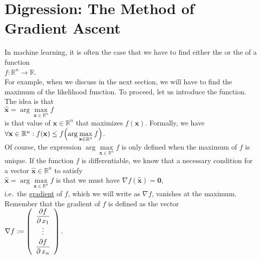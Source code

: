 \section{Digression: The Method of Gradient Ascent \label{section:gradient-ascent}}
In machine learning, it is often the case that we have to find either the  or the 
of a function 
\\[0.2cm]
\hspace*{1.3cm}
$f: \mathbb{R}^n \rightarrow \mathbb{R}$.
\\[0.2cm]
For example, when we discuss  in the next section, we will have to find the maximum
of the likelihood function.  To proceed, let us introduce the \blue{$\arg\max$} function.  The idea is that
\\[0.2cm]
\hspace*{1.3cm}
$\mathbf{\widehat{x}} = \arg\max\limits_{\mathbf{x}\in \mathbb{R}^n} f$
\\[0.2cm]
is that value of $\mathbf{x} \in \mathbb{R}^n$ that maximizes $ f(\mathbf{x})$.  Formally, we have
\\[0.2cm]
\hspace*{1.3cm}
$\forall \mathbf{x} \in \mathbb{R}^n : f(\mathbf{x}) \leq f\Bigl(\arg\max\limits_{\mathbf{x}\in \mathbb{R}^n} f\Bigr)$.
\\[0.2cm]
Of course, the expression $\arg\max\limits_{\mathbf{x}\in \mathbb{R}^n} f$ is only defined when the maximum of
$f$ is unique.  If the function $f$ is differentiable, we know that a necessary condition for a vector
$\mathbf{\widehat{x}} \in \mathbb{R}^n$ to satisfy
\\[0.2cm]
\hspace*{1.3cm}
$\mathbf{\widehat{x}} = \arg\max\limits_{\mathbf{x}\in \mathbb{R}^n} f$ \quad is that we must have \quad $\nabla f(\mathbf{\widehat{x}}) = \mathbf{0}$,
\\[0.2cm]
i.e.~the \href{https://en.wikipedia.org/wiki/Gradient}{gradient} of $f$, which we will write as $\nabla f$,
vanishes at the maximum.  Remember that the gradient of $f$ is defined as the vector
\\[0.2cm]
\hspace*{1.3cm}
$\nabla f := \left(
 \begin{array}{c}
 \displaystyle\frac{\partial f}{\partial\, x_1} \\
    \vdots                            \\[0.1cm]
 \displaystyle\frac{\partial f}{\partial\, x_n} \\ 
 \end{array}
 \right).
$
\vspace*{0.2cm}

